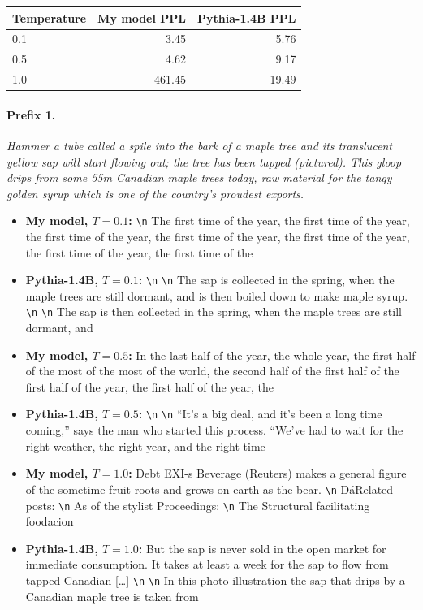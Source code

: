\documentclass{article}
\begin{document}
\begin{center}
\begin{tabular}{lrr}
\toprule
Temperature & My model PPL & Pythia-1.4B PPL \\
\midrule
0.1 & 3.45 & 5.76 \\
0.5 & 4.62 & 9.17 \\
1.0 & 461.45 & 19.49 \\
\bottomrule
\end{tabular}
\end{center}

\paragraph{Prefix 1.} \textit{Hammer a tube called a spile into the bark of a maple tree and its translucent yellow sap will start flowing out; the tree has been tapped (pictured). This gloop drips from some 55m Canadian maple trees today, raw material for the tangy golden syrup which is one of the country's proudest exports.}

\begin{itemize}
  \item \textbf{My model, $T=0.1$:}  \texttt{\textbackslash n} The first time of the year, the first time of the year, the first time of the year, the first time of the year, the first time of the year, the first time of the year, the first time of the
  \item \textbf{Pythia-1.4B, $T=0.1$:}  \texttt{\textbackslash n}  \texttt{\textbackslash n} The sap is collected in the spring, when the maple trees are still dormant, and is then boiled down to make maple syrup. \texttt{\textbackslash n}  \texttt{\textbackslash n} The sap is then collected in the spring, when the maple trees are still dormant, and
  \item \textbf{My model, $T=0.5$:}  In the last half of the year, the whole year, the first half of the most of the most of the world, the second half of the first half of the first half of the year, the first half of the year, the
  \item \textbf{Pythia-1.4B, $T=0.5$:}  \texttt{\textbackslash n}  \texttt{\textbackslash n} ``It's a big deal, and it's been a long time coming,'' says the man who started this process. ``We've had to wait for the right weather, the right year, and the right time
  \item \textbf{My model, $T=1.0$:}  Debt EXI-s Beverage (Reuters) makes a general figure of the sometime fruit roots and grows on earth as the bear. \texttt{\textbackslash n} D\'{a}Related posts: \texttt{\textbackslash n} As of the stylist Proceedings: \texttt{\textbackslash n} The Structural facilitating foodacion
  \item \textbf{Pythia-1.4B, $T=1.0$:}  But the sap is never sold in the open market for immediate consumption. It takes at least a week for the sap to flow from tapped Canadian [\ldots{}] \texttt{\textbackslash n}  \texttt{\textbackslash n} In this photo illustration the sap that drips by a Canadian maple tree is taken from
\end{itemize}
\end{document}
